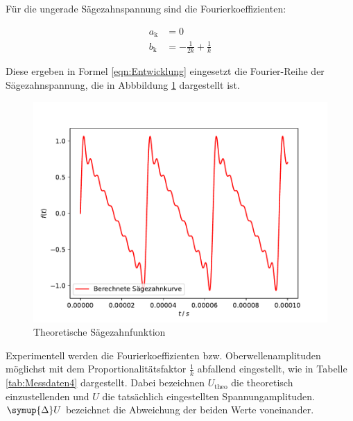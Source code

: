 Für die ungerade Sägezahnspannung sind die Fourierkoeffizienten:

\begin{align*}
    a_\text{k} &= 0 \\
    b_\text{k} &= - \frac{1}{2k} + \frac{1}{k}
\end{align*}

Diese ergeben in Formel \eqref{eqn:Entwicklung} eingesetzt die Fourier-Reihe
der Sägezahnspannung, die in Abbbildung \ref{fig:Theo1} dargestellt ist.

\begin{figure}[H]
    \centering
    \includegraphics[scale = 0.6]{content/plot4.pdf}
    \caption{Theoretische Sägezahnfunktion}
    \label{fig:Theo1}
\end{figure}

Experimentell werden die Fourierkoeffizienten bzw. Oberwellenamplituden möglichst mit dem
Proportionalitätsfaktor $\frac{1}{k}$ abfallend eingestellt, wie in Tabelle \ref{tab:Messdaten4}
dargestellt. Dabei bezeichnen $U_\text{theo}$ die theoretisch einzustellenden und $U$ die
tatsächlich eingestellten Spannungamplituden. $\symup{\Delta}U$ bezeichnet die Abweichung der
beiden Werte voneinander.

